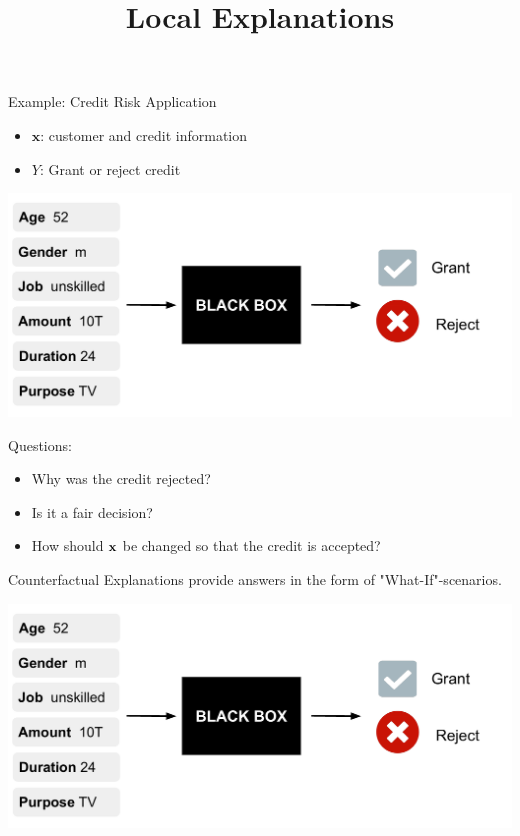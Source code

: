 \documentclass[11pt,compress,t,notes=noshow, xcolor=table]{beamer}
\title{Local Explanations}
\institute{\href{https://compstat-lmu.github.io/lecture_i2ml/}{compstat-lmu.github.io/lecture\_i2ml}}
\date{}
\begin{document}
	









\begin{vbframe}{Example: Credit Risk Application} 
	\begin{itemize}
		\item $\textbf{x}$: customer and credit information
		\item $Y$: Grant or reject credit
	\end{itemize}
	\begin{center}\includegraphics[width=0.65\linewidth, page=1]{figure/counterfactuals_credit.pdf} \end{center}
	
	Questions: 
	\begin{itemize}
		\item Why was the credit rejected? 
		\item Is it a fair decision? 
		\item How should $\xv$ be changed so that the credit is accepted?  
	\end{itemize}
	
	\framebreak
	Counterfactual Explanations provide answers in the form of "What-If"-scenarios. 
	\begin{center}\includegraphics[width=0.65\linewidth, page=2]{figure/counterfactuals_credit.pdf} \end{center}
	

\end{vbframe}
\end{document}
